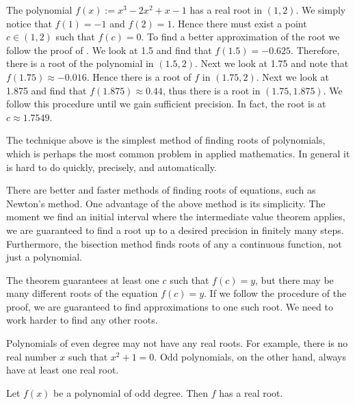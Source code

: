 \begin{example} %
The polynomial $f(x) := x^3-2x^2+x-1$ has a real root in $(1,2)$.  We simply
notice that $f(1) = -1$ and $f(2) = 1$.  Hence there must exist a point $c
\in (1,2)$ such that $f(c) = 0$.  To find a better approximation of
the root we follow the proof of .  
We look at 1.5 and find that $f(1.5) = -0.625$.  Therefore,
there is a root of the polynomial in $(1.5,2)$.  Next we look at 1.75
and note that $f(1.75) \approx -0.016$.  Hence there is a root of $f$ in
$(1.75,2)$.  Next we look at 1.875 and find that $f(1.875) \approx 0.44$,
thus there is a root in $(1.75,1.875)$.  We follow this procedure until we gain
sufficient precision.  In fact, the root is at $c \approx 1.7549$.
\end{example}

The technique above is the simplest method of finding roots of polynomials,
which is perhaps the most common problem in applied
mathematics.  In general it is hard to do quickly, precisely,
and automatically.

There are better and faster methods of finding roots of equations, such
as Newton's method.  One advantage of the above method is its
simplicity.  The
moment we find an initial interval where the intermediate value theorem
applies, we are guaranteed to find a root up to a desired
precision in finitely many steps.  Furthermore, the bisection
method finds
roots of any
a continuous function, not just a polynomial.

The theorem guarantees at least one $c$ such that $f(c) = y$, but there
may be many different roots of the equation $f(c) = y$.  If we follow
the procedure of the proof, we are guaranteed to find approximations to
one such root.  We need to work harder to find any other roots.

\medskip

Polynomials of even degree may not have any real roots.  For example,
there is no real number $x$ such that $x^2+1 = 0$.  Odd polynomials, on the
other hand, always have at least one real root.

\begin{prop}
Let $f(x)$ be a polynomial of odd degree.  Then $f$ has a real root.
\end{prop}

